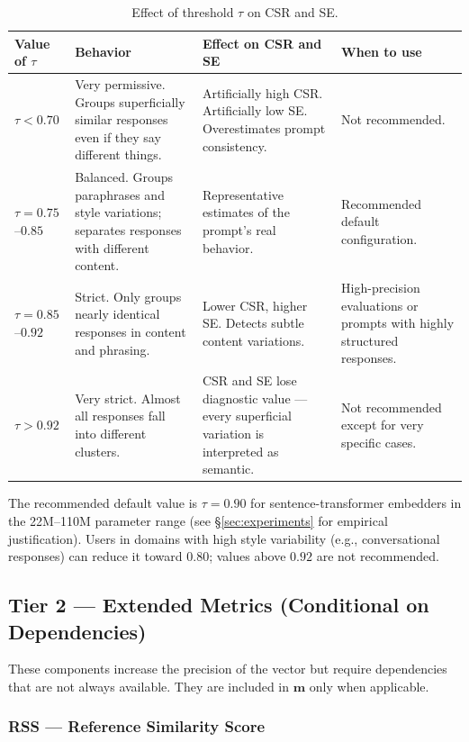\documentclass[11pt,a4paper]{article}
\begin{document}
\begin{table}[h]
\centering
\caption{Effect of threshold $\tau$ on CSR and SE.}
\label{tab:tau}
\begin{tabular}{p{2cm} p{3.5cm} p{3.5cm} p{3.5cm}}
\toprule
Value of $\tau$ & Behavior & Effect on CSR and SE & When to use \\
\midrule
$\tau < 0.70$ &
Very permissive. Groups superficially similar responses even if they say different things. &
Artificially high CSR. Artificially low SE. Overestimates prompt consistency. &
Not recommended. \\
\addlinespace
$\tau = 0.75$--$0.85$ &
Balanced. Groups paraphrases and style variations; separates responses with different content. &
Representative estimates of the prompt's real behavior. &
Recommended default configuration. \\
\addlinespace
$\tau = 0.85$--$0.92$ &
Strict. Only groups nearly identical responses in content and phrasing. &
Lower CSR, higher SE. Detects subtle content variations. &
High-precision evaluations or prompts with highly structured responses. \\
\addlinespace
$\tau > 0.92$ &
Very strict. Almost all responses fall into different clusters. &
CSR and SE lose diagnostic value — every superficial variation is interpreted as semantic. &
Not recommended except for very specific cases. \\
\bottomrule
\end{tabular}
\end{table}

\noindent The recommended default value is $\tau = 0.90$ for sentence-transformer embedders in the 22M--110M parameter range (see \S\ref{sec:experiments} for empirical justification). Users in domains with high style variability (e.g., conversational responses) can reduce it toward $0.80$; values above $0.92$ are not recommended.

\subsection{Tier 2 — Extended Metrics (Conditional on Dependencies)}

These components increase the precision of the vector but require dependencies that are not always available. They are included in $\mathbf{m}$ only when applicable.

\subsubsection{RSS — Reference Similarity Score}
\end{document}
